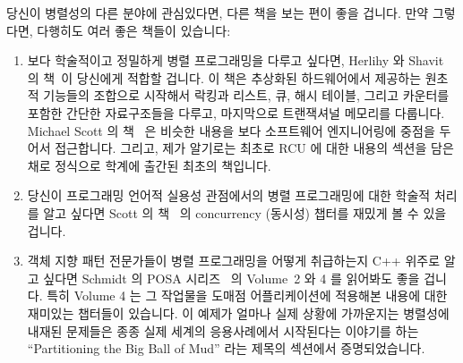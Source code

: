 당신이 병렬성의 다른 분야에 관심있다면, 다른 책을 보는 편이 좋을 겁니다.
만약 그렇다면, 다행히도 여러 좋은 책들이 있습니다:


\begin{enumerate}
\item	보다 학술적이고 정밀하게 병렬 프로그래밍을 다루고 싶다면, Herlihy 와
	Shavit 의 책~\cite{HerlihyShavit2008Textbook}이 당신에게 적합할 겁니다.
	이 책은 추상화된 하드웨어에서 제공하는 원초적 기능들의 조합으로
	시작해서 락킹과 리스트, 큐, 해시 테이블, 그리고 카운터를 포함한 간단한
	자료구조들을 다루고, 마지막으로 트랜잭셔널 메모리를 다룹니다.  Michael
	Scott 의 책~\cite{MichaelScott2013Textbook} 은 비슷한 내용을 보다
	소프트웨어 엔지니어링에 중점을 두어서 접근합니다. 그리고, 제가 알기로는
	최초로 RCU 에 대한 내용의 섹션을 담은 채로 정식으로 학계에 출간된
	최초의 책입니다.


\item	당신이 프로그래밍 언어적 실용성 관점에서의 병렬 프로그래밍에 대한
	학술적 처리를 알고 싶다면 Scott 의 책~\cite{MichaelScott2006Textbook}
	의 concurrency (동시성) 챕터를 재밌게 볼 수 있을 겁니다.


\item	객체 지향 패턴 전문가들이 병렬 프로그래밍을 어떻게 취급하는지 C++
	위주로 알고 싶다면 Schmidt 의 POSA
	시리즈~\cite{SchmidtStalRohnertBuschmann2000v2Textbook,
	BuschmannHenneySchmidt2007v4Textbook} 의 Volume~2 와 4 를 읽어봐도 좋을
	겁니다.  특히 Volume 4 는 그 작업물을 도매점 어플리케이션에 적용해본
	내용에 대한 재미있는 챕터들이 있습니다.  이 예제가 얼마나 실제 상황에
	가까운지는 병렬성에 내재된 문제들은 종종 실제 세계의 응용사례에서
	시작된다는 이야기를 하는 ``Partitioning the Big Ball of Mud'' 라는
	제목의 섹션에서 증명되었습니다.


\end{enumerate}
